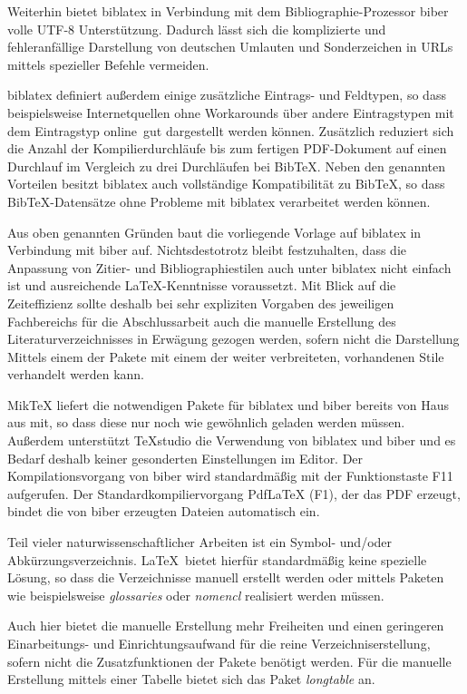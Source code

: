 Weiterhin bietet biblatex in Verbindung mit dem Bibliographie-Prozessor biber volle UTF-8 Unterstützung. Dadurch lässt sich die komplizierte und fehleranfällige Darstellung von deutschen Umlauten und Sonderzeichen in URLs mittels spezieller Befehle vermeiden.

biblatex definiert außerdem einige zusätzliche Eintrags- und Feldtypen, so dass beispielsweise Internetquellen ohne Workarounds über andere Eintragstypen mit dem Eintragstyp \glqq online\grqq\ gut dargestellt werden können. Zusätzlich reduziert sich die Anzahl der Kompilierdurchläufe bis zum fertigen PDF-Dokument auf einen Durchlauf im Vergleich zu drei Durchläufen bei BibTeX. Neben den genannten Vorteilen besitzt biblatex auch vollständige Kompatibilität zu BibTeX, so dass BibTeX-Datensätze ohne Probleme mit biblatex verarbeitet werden können.

Aus oben genannten Gründen baut die vorliegende Vorlage auf biblatex in Verbindung mit biber auf.
Nichtsdestotrotz bleibt festzuhalten, dass die Anpassung von Zitier- und Bibliographiestilen auch unter biblatex nicht einfach ist und ausreichende \LaTeX-Kenntnisse voraussetzt. Mit Blick auf die Zeiteffizienz sollte deshalb bei sehr expliziten Vorgaben des jeweiligen Fachbereichs für die Abschlussarbeit auch die manuelle Erstellung des Literaturverzeichnisses in Erwägung gezogen werden, sofern nicht die Darstellung Mittels einem der Pakete mit einem der weiter verbreiteten, vorhandenen Stile verhandelt werden kann.

MikTeX liefert die notwendigen Pakete für biblatex und biber bereits von Haus aus mit, so dass diese nur noch wie gewöhnlich geladen werden müssen. Außerdem unterstützt TeXstudio die Verwendung von biblatex und biber und es Bedarf deshalb keiner gesonderten Einstellungen im Editor. Der Kompilationsvorgang von biber wird standardmäßig mit der Funktionstaste F11 aufgerufen. Der Standardkompiliervorgang PdfLaTeX (F1), der das PDF erzeugt, bindet die von biber erzeugten Dateien automatisch ein.

Teil vieler naturwissenschaftlicher Arbeiten ist ein Symbol- und/oder Abkürzungsverzeichnis. \LaTeX\ bietet hierfür standardmäßig keine spezielle Lösung, so dass die Verzeichnisse manuell erstellt werden oder mittels Paketen wie beispielsweise \textit{glossaries} oder \textit{nomencl} realisiert werden müssen.

Auch hier bietet die manuelle Erstellung mehr Freiheiten und einen geringeren Einarbeitungs- und Einrichtungsaufwand für die reine Verzeichniserstellung, sofern nicht die Zusatzfunktionen der Pakete benötigt werden. Für die manuelle Erstellung mittels einer Tabelle bietet sich das Paket \emph{longtable} an.

